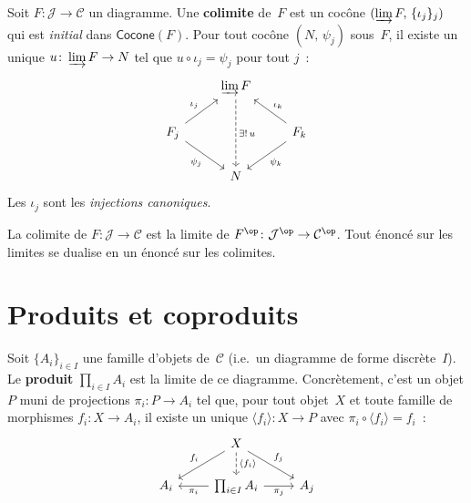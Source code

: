 \begin{definition}[Colimite]\label{def:colimite}
Soit $F\colon\mathcal{J}\to\mathcal{C}$ un diagramme.
Une \textbf{colimite} de~$F$ est un cocône $(\varinjlim F,\,\{\iota_j\}_{j})$
qui est \emph{initial} dans $\mathsf{Cocone}(F)$.
Pour tout cocône $(N,\,\psi_j)$ sous~$F$, il existe un unique
$u\colon \varinjlim F\to N$ tel que $u\circ\iota_j = \psi_j$
pour tout $j$~:
\[
\begin{tikzcd}
& \varinjlim F \arrow[dd, dashed, "\exists!\, u"] & \\
F_j \arrow[ur, "\iota_j"] \arrow[dr, "\psi_j"'] & & F_k \arrow[ul, "\iota_k"'] \arrow[dl, "\psi_k"] \\
& N &
\end{tikzcd}
\]
Les $\iota_j$ sont les \emph{injections canoniques}.
\end{definition}

\begin{remarque}\label{rem:colimite-dualite}
La colimite de $F\colon\mathcal{J}\to\mathcal{C}$ est la limite de
$F^{\op}\colon\mathcal{J}^{\op}\to\mathcal{C}^{\op}$.
Tout énoncé sur les limites se dualise en un énoncé sur les colimites.
\end{remarque}


\section{Produits et coproduits}\label{sec:produits-coproduits}

\begin{definition}[Produit]\label{def:produit}
Soit $\{A_i\}_{i\in I}$ une famille d'objets de~$\mathcal{C}$
(i.e.\ un diagramme de forme discrète~$I$).
Le \textbf{produit} $\prod_{i\in I}A_i$ est la limite de ce diagramme.
Concrètement, c'est un objet $P$ muni de projections
$\pi_i\colon P\to A_i$ tel que, pour tout objet~$X$ et toute famille
de morphismes $f_i\colon X\to A_i$, il existe un unique
$\langle f_i\rangle\colon X\to P$ avec $\pi_i\circ\langle f_i\rangle = f_i$~:
\[
\begin{tikzcd}
& X \arrow[dl, "f_i"'] \arrow[d, dashed, "{\langle f_i\rangle}"] \arrow[dr, "f_j"] & \\
A_i & \prod_{i\in I}A_i \arrow[l, "\pi_i"] \arrow[r, "\pi_j"'] & A_j
\end{tikzcd}
\]
\end{definition}

